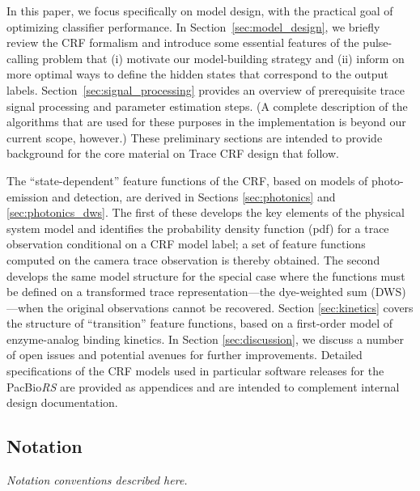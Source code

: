 \documentclass[10pt]{article}
\newcommand{\dws}{{\small DWS}}
\newcommand{\crf}{{\small CRF}}
\newcommand{\tcrf}{Trace {\small CRF}}
\newcommand{\theRS}{the PacBio\hspace{2 pt}\textit{RS}}
\begin{document}
In this paper, we focus specifically on model design, with the practical goal of optimizing classifier performance.
In Section~\ref{sec:model_design}, we briefly review the \crf{} formalism and introduce some essential features of the pulse-calling problem that
(i) motivate our model-building strategy and
(ii) inform on more optimal ways to define the hidden states that correspond to the output labels.
Section~\ref{sec:signal_processing} provides an overview of prerequisite trace signal processing and parameter estimation steps. 
(A complete description of the algorithms that are used for these purposes in the implementation is beyond our current scope, however.)
These preliminary sections are intended to provide background for the core material on \tcrf{} design that follow.

The ``state-dependent'' feature functions of the \crf, based on models of photo-emission and detection, are derived in Sections \ref{sec:photonics} and \ref{sec:photonics_dws}.
The first of these develops the key elements of the physical system model and identifies the probability density function (pdf) for a trace observation conditional on a \crf{} model label; a set of feature functions computed on the camera trace observation is thereby obtained.
The second develops the same model structure for the special case where the functions
must be defined on a transformed trace representation---the dye-weighted sum (\dws)---when the original observations cannot be recovered.
%
Section \ref{sec:kinetics} covers the structure of ``transition'' feature functions, based on a first-order model of enzyme-analog binding kinetics.
In Section \ref{sec:discussion}, we discuss a number of open issues and potential avenues for further improvements.
Detailed specifications of the \crf{} models used in particular software releases for \theRS{} are provided as appendices and are intended to complement internal design documentation.   

\subsection{Notation}
\label{sec:notation}
\emph{Notation conventions described here.}

\end{document}
